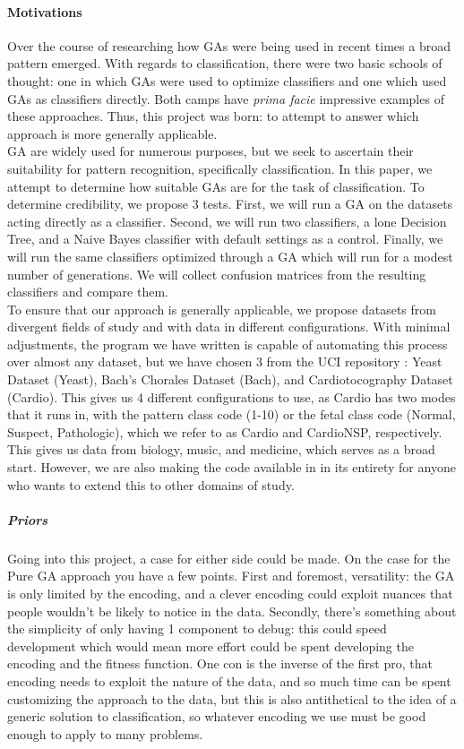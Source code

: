 \paragraph{Motivations}
Over the course of researching how GAs were being used in recent times a broad pattern emerged.  With regards to classification, there were two basic schools of thought:  one in which GAs were used to optimize classifiers and one which used GAs as classifiers directly.  Both camps have \textit{prima facie} impressive examples of these approaches.  Thus, this project was born: to attempt to answer which approach is more generally applicable.\\
GA are widely used for numerous purposes, but we seek to ascertain their suitability for pattern recognition, specifically classification.  In this paper, we attempt to determine how suitable GAs are for the task of classification.  To determine credibility, we propose 3 tests.  First, we will run a GA on the datasets acting directly as a classifier.  Second, we will run two classifiers, a lone Decision Tree, and a Naive Bayes classifier with default settings as a control.  Finally, we will run the same classifiers optimized through a GA which will run for a modest number of generations.  We will collect confusion matrices from the resulting classifiers and compare them.\\
To ensure that our approach is generally applicable, we propose datasets from divergent fields of study and with data in different configurations.  With minimal adjustments, the program we have written is capable of automating this process over almost any dataset, but we have chosen 3 from the UCI repository\citep{lichman_uci_2013} : Yeast Dataset (Yeast)\citep{paul_horton_uci_1996}, Bach's Chorales Dataset (Bach)\citep{daniele_p._radicioni_uci_2014}, and Cardiotocography Dataset (Cardio)\citep{j._p._marques_de_sa_uci_2010}.  This gives us 4 different configurations to use, as Cardio has two modes that it runs in, with the pattern class code (1-10) or the fetal class code (Normal, Suspect, Pathologic), which we refer to as Cardio and CardioNSP, respectively.  This gives us data from biology, music, and medicine, which serves as a broad start.  However, we are also making the code available in in its entirety for anyone who wants to extend this to other domains of study.\\
\subparagraph{Priors}
Going into this project, a case for either side could be made.  On the case for the Pure GA approach you have a few points.  First and foremost, versatility:  the GA is only limited by the encoding, and a clever encoding could exploit nuances that people wouldn't be likely to notice in the data.  Secondly, there's something about the simplicity of only having 1 component to debug: this could speed development which would mean more effort could be spent developing the encoding and the fitness function.  One con is the inverse of the first pro, that encoding needs to exploit the nature of the data, and so much time can be spent customizing the approach to the data, but this is also antithetical to the idea of a generic solution to classification, so whatever encoding we use must be good enough to apply to many problems.\\
